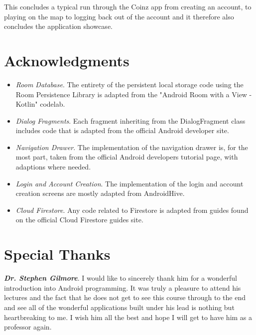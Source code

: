 \documentclass[11pt,a4paper,notitlepage]{article}
\begin{document}
    This concludes a typical run through the Coinz app from creating an account, to playing on the map to logging back out of the account and it therefore also concludes the application showcase.

\section{Acknowledgments}

    \begin{itemize}
        \item \emph{Room Database}. The entirety of the persistent local storage code using the Room Persistence Library is adapted from the "Android Room with a View - Kotlin" codelab. \cite{room-tutorial}

        \item \emph{Dialog Fragments}. Each fragment inheriting from the DialogFragment class includes code that is adapted from the official Android developer site. \cite{dialog-tutorial}

        \item \emph{Navigation Drawer}. The implementation of the navigation drawer is, for the most part, taken from the official Android developers tutorial page, with adaptions where needed. \cite{nav-drawer}

        \item \emph{Login and Account Creation}. The implementation of the login and account creation screens are mostly adapted from AndroidHive. \cite{firebase-login}

        \item \emph{Cloud Firestore}. Any code related to Firestore is adapted from guides found on the official Cloud Firestore guides site. \cite{firestore-guides}
    \end{itemize}

\section*{Special Thanks}

    \textbf{\emph{Dr. Stephen Gilmore}}. I would like to sincerely thank him for a wonderful introduction into Android programming. It was truly a pleasure to attend his lectures and the fact that he does not get to see this course through to the end and see all of the wonderful applications built under his lead is nothing but heartbreaking to me. I wish him all the best and hope I will get to have him as a professor again.


\newpage
\printbibliography
\end{document}
